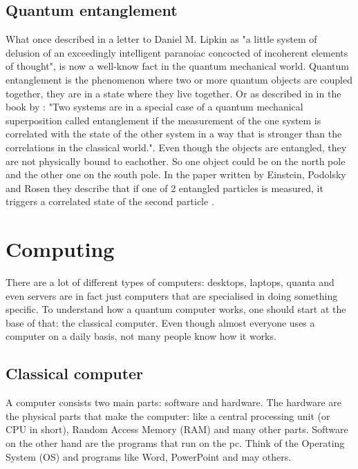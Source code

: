 \subsection{Quantum entanglement} \label{quantum entanglement}
What \textcite{Einstein} once described in a letter to Daniel M. Lipkin as "a little system of delusion of an exceedingly intelligent paranoiac concocted of incoherent elements of thought", is now a well-know fact in the quantum mechanical world.
Quantum entanglement is the phenomenon where two or more quantum objects are coupled together, they are in a state where they live together.
Or as described in in the book by \textcite{Hidary_2019}: "Two systems are in a special case of a quantum mechanical superposition called entanglement if the measurement of the one system is correlated with the state of the other system in a way that is stronger than the correlations in the classical world.".
Even though the objects are entangled, they are not physically bound to eachother. So one object could be on the north pole and the other one on the south pole.
In the paper written by Einstein, Podolsky and Rosen they describe that if one of 2 entangled particles is measured, it triggers a correlated state of the second particle \autocite{EPR}.


\section{Computing} \label{computing}
There are a lot of different types of computers: desktops, laptops, quanta and even servers are in fact just computers that are specialised in doing something specific.
To understand how a quantum computer works, one should start at the base of that: the classical computer. Even though almost everyone uses a computer on a daily basis, not many people know how it works.


\subsection{Classical computer} \label{classical computer}
A computer consists two main parts: software and hardware. The hardware are the physical parts that make the computer: like a central processing unit (or CPU in short), Random Access Memory (RAM) and many other parts.
Software on the other hand are the programs that run on the pc. Think of the Operating System (OS) and programs like Word, PowerPoint and may others.


